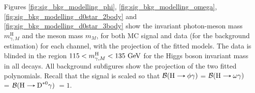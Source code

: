 Figures \ref{fig:sig_bkg_modelling_phi}, \ref{fig:sig_bkg_modelling_omega}, \ref{fig:sig_bkg_modelling_d0star_2body} and \ref{fig:sig_bkg_modelling_d0star_3body} show the invariant photon-meson mass $m^{\text{H}}_{\gamma, M}$ and the meson mass $m_{M}$, for both MC signal and data (for the background estimation) for each channel, with the projection of the fitted models. The data is blinded in the region $115 < m^{\text{H}}_{\gamma, M} < 135\ \text{GeV}$ for the Higgs boson invariant mass in all decays. All background subfigures show the projection of the two fitted polynomials. Recall that the signal is scaled so that $\mathcal{B}(\text{H}\protect\decaysto \phi\gamma)$ = $\mathcal{B}(\text{H}\protect\decaysto \omega\gamma)$ = $\mathcal{B}(\text{H}\protect\decaysto \text{D}^{*0}\gamma)$ $=1$.

\newpage

